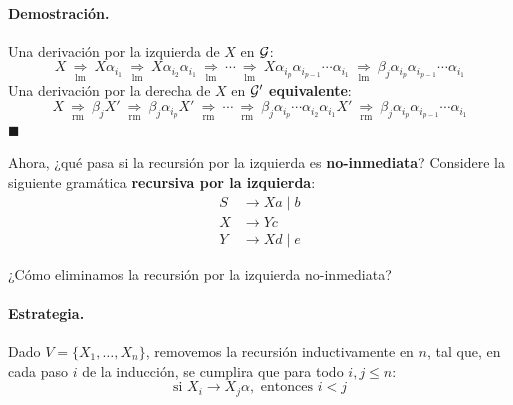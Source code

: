     \paragraph{Demostración.} Una derivación por la izquierda de $X$ en $\mathcal{G}$:
    $$
        X \ \underset{\mathrm{lm}}{\Rightarrow} \ X \alpha_{i_1} \ \underset{\mathrm{lm}}{\Rightarrow} \ X \alpha_{i_2} \alpha_{i_1} \ \underset{\mathrm{lm}}{\Rightarrow} \ \cdots \ \underset{\mathrm{lm}}{\Rightarrow}\ X \alpha_{i_p} \alpha_{i_{p-1}} \cdots \alpha_{i_1} \ \underset{\mathrm{lm}}{\Rightarrow} \ \beta_j \alpha_{i_p} \alpha_{i_{p-1}} \cdots \alpha_{i_1}
    $$
    Una derivación por la derecha de $X$ en $\mathcal{G}'$ \textbf{equivalente}:
    $$
        X \ \underset{\mathrm{rm}}{\Rightarrow} \ \beta_j X' \ \underset{\mathrm{rm}}{\Rightarrow} \ \beta_j \alpha_{i_p} X' \ \underset{\mathrm{rm}}{\Rightarrow} \ \cdots \ \underset{\mathrm{rm}}{\Rightarrow}\ \beta_j \alpha_{i_p} \cdots \alpha_{i_2} \alpha_{i_1} X' \ \underset{\mathrm{rm}}{\Rightarrow} \ \beta_j \alpha_{i_p} \alpha_{i_{p-1}} \cdots \alpha_{i_1}
    $$
    \hfill $\blacksquare$ \bigbreak

    Ahora, ¿qué pasa si la recursión por la izquierda es \textbf{no-inmediata}? Considere la siguiente gramática \textbf{recursiva por la izquierda}:
    \begin{align*}
        S & \to Xa \mid b \\
        X & \to Yc        \\
        Y & \to Xd \mid e
    \end{align*}

    ¿Cómo eliminamos la recursión por la izquierda no-inmediata?
    \paragraph{Estrategia.} Dado $V = \{X_1,\ldots,X_n\}$, removemos la recursión inductivamente en $n$, tal que, en cada paso $i$ de la inducción, se cumplira que para todo $i,j\leq n$:
    $$
        \text{si } X_i \to X_j \alpha, \text{ entonces } i < j
    $$

